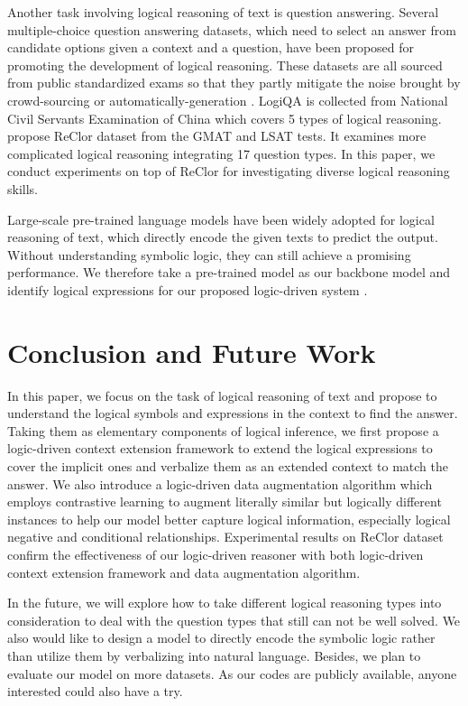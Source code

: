 \documentclass[11pt,a4paper]{article}
\begin{document}
Another task involving logical reasoning of text is question answering. Several multiple-choice question answering datasets, which need to select an answer from candidate options given a context and a question, have been proposed for promoting the development of logical reasoning. These datasets are all sourced from public standardized exams so that they partly mitigate the noise brought by crowd-sourcing or automatically-generation \cite{lai2017race}. LogiQA \cite{liu2020logiqa} is collected from National Civil Servants Examination of China which covers 5 types of logical reasoning. \citet{yu2020reclor} propose ReClor dataset from the GMAT and LSAT tests. It examines more complicated logical reasoning integrating 17 question types. In this paper, we conduct experiments on top of ReClor for investigating diverse logical reasoning skills. 

Large-scale pre-trained language models \cite{devlin2019bert, liu2019roberta, yang2019xlnet, lan2019albert} have been widely adopted for logical reasoning of text, which directly encode the given texts to predict the output. Without understanding symbolic logic, they can still achieve a promising performance. We therefore take a pre-trained model as our backbone model and identify logical expressions for our proposed logic-driven system .

\section{Conclusion and Future Work}
In this paper, we focus on the task of logical reasoning of text and propose to understand the logical symbols and expressions in the context to find the answer. Taking them as elementary components of logical inference, we first propose a logic-driven context extension framework to extend the logical expressions to cover the implicit ones and verbalize them as an extended context to match the answer. We also introduce a logic-driven data augmentation algorithm which employs contrastive learning to augment literally similar but logically different instances to help our model better capture logical information, especially logical negative and conditional relationships. Experimental results on ReClor dataset confirm the effectiveness of our logic-driven reasoner with both logic-driven context extension framework and data augmentation algorithm.

In the future, we will explore how to take different logical reasoning types into consideration to deal with the question types that still can not be well solved. We also would like to design a model to directly encode the symbolic logic rather than utilize them by verbalizing into natural language. Besides, we plan to evaluate our model on more datasets. As our codes are publicly available, anyone interested 
could also have a try.




\end{document}
